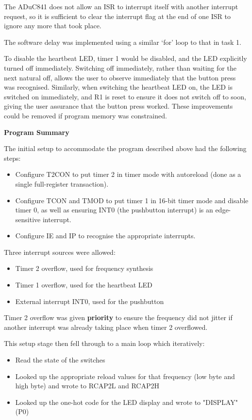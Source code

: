\documentclass[11pt]{article}
\begin{document}
The ADuC841 does not allow an ISR to interrupt itself with another interrupt request, so it is sufficient to clear the interrupt flag at the end of one ISR to ignore any more that took place.

The software delay was implemented using a similar `for' loop to that in task 1.

To disable the heartbeat LED, timer 1 would be disabled, and the LED explicitly turned off immediately. Switching off immediately, rather than waiting for the next natural off, allows the user to observe immediately that the button press was recognised. Similarly, when switching the heartbeat LED on, the LED is switched on immediately, and R1 is reset to ensure it does not switch off to soon, giving the user assurance that the button press worked. These improvements could be removed if program memory was constrained.

\textbf{Program Summary}

The initial setup to accommodate the program described above had the following steps:
\begin{itemize}
    \item Configure T2CON to put timer 2 in timer mode with autoreload (done as a single full-register transaction).
    \item Configure TCON and TMOD to put timer 1 in 16-bit timer mode and disable timer 0, as well as ensuring INT0 (the pushbutton interrupt) is an edge-sensitive interrupt.
    \item Configure IE and IP to recognise the appropriate interrupts.
\end{itemize}

Three interrupt sources were allowed:
\begin{itemize}
    \item Timer 2 overflow, used for frequency synthesis
    \item Timer 1 overflow, used for the heartbeat LED
    \item External interrupt INT0, used for the pushbutton
\end{itemize}

Timer 2 overflow was given \textbf{priority} to ensure the frequency did not jitter if another interrupt was already taking place when timer 2 overflowed.

This setup stage then fell through to a main loop which iteratively:
\begin{itemize}
    \item Read the state of the switches
    \item Looked up the appropriate reload values for that frequency (low byte and high byte) and wrote to RCAP2L and RCAP2H
    \item Looked up the one-hot code for the LED display and wrote to "DISPLAY" (P0)
\end{itemize}
\end{document}
